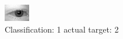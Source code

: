 \begin{figure}[h!]
\begin{center}
\includegraphics[width=0.60\columnwidth]{figures/ID439_class_1_target_2.png}
\end{center}
\caption{ Classification: 1 actual target: 2}
\label{fig:ID439_class_1_target_2}
\end{figure}
